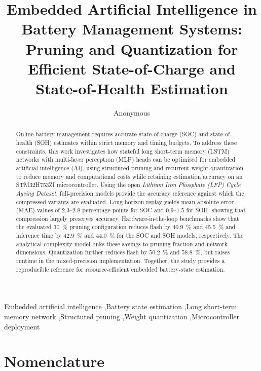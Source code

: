 \documentclass[review]{elsarticle}
\date{}
\begin{document}
\linenumbers
\begin{frontmatter}
\title{Embedded Artificial Intelligence in Battery Management Systems: Pruning and Quantization for Efficient State-of-Charge and State-of-Health Estimation}
\author{Anonymous}
\begin{abstract}
Online battery management requires accurate state-of-charge (SOC) and state-of-health (SOH) estimates within strict memory and timing budgets. To address these constraints, this work investigates how stateful long short-term memory (LSTM) networks with multi-layer perceptron (MLP) heads can be optimised for embedded artificial intelligence (AI), using structured pruning and recurrent-weight quantization to reduce memory and computational costs while retaining estimation accuracy on an STM32H753ZI microcontroller. Using the open \emph{Lithium Iron Phosphate (LFP) Cycle Ageing Dataset}, full-precision models provide the accuracy reference against which the compressed variants are evaluated. Long-horizon replay yields mean absolute error (MAE) values of $2.3$--$2.8$ percentage points for SOC and $0.9$--$1.5$ for SOH, showing that compression largely preserves accuracy. Hardware-in-the-loop benchmarks show that the evaluated 30~\% pruning configuration reduces flash by $40.9$~\% and $45.5$~\% and inference time by $42.9$~\% and $44.0$~\% for the SOC and SOH models, respectively. The analytical complexity model links these savings to pruning fraction and network dimensions. Quantization further reduces flash by $50.2$~\% and $58.8$~\%, but raises runtime in the mixed-precision implementation. Together, the study provides a reproducible reference for resource-efficient embedded battery-state estimation.
\end{abstract}
\begin{keyword}
Embedded artificial intelligence \sep Battery state estimation \sep Long short-term memory network \sep Structured pruning \sep Weight quantization \sep Microcontroller deployment
\end{keyword}
\end{frontmatter}
\section*{Nomenclature}
\small
\end{document}

